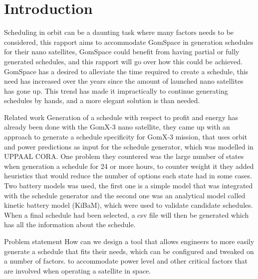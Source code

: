 \chapter{Introduction}\label{cha:intro}
Scheduling in orbit can be a daunting task where many factors needs to be considered, this rapport aims to accommodate GomSpace in generation schedules for their nano satellites, GomSpace could benefit from having partial or fully generated schedules, and this rapport will go over how this could be achieved. GomSpace has a desired to alleviate the time required to create a schedule, this need has increased over the years since the amount of launched nano satellites has gone up. This trend has made it impractically to continue generating schedules by hands, and a more elegant solution is than needed.

Related work %
Generation of a schedule with respect to profit and energy has already been done with the GomX-3 nano satellite, they came up with an approach to generate a schedule specificity for GomX-3 mission, that uses orbit and power predictions as input for the schedule generator, which was modelled in UPPAAL CORA. One problem they countered was the large number of states when generation a schedule for 24 or more hours, to counter weight it they added heuristics that would reduce the number of options each state had in some cases. Two battery models was used, the first one is a simple model that was integrated with the schedule generator and the second one was an analytical model called kinetic battery model (KiBaM), which were used to validate candidate schedules. When a final schedule had been selected, a csv file will then be generated which has all the information about the schedule.

Problem statement
How can we design a tool that allows engineers to more easily generate a schedule that fits their needs, which can be configured and tweaked on a number of factors. to accommodate power level and other critical factors that are involved when operating a satellite in space.



	


